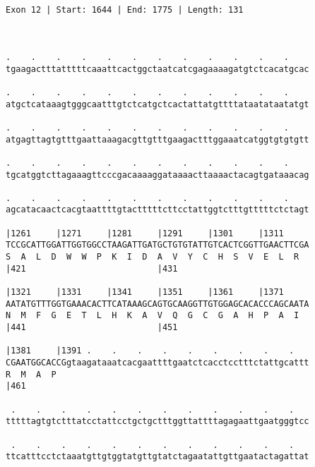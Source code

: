 \documentclass{article}
\begin{document}
\begin{Verbatim}
               
 
Exon 12 | Start: 1644 | End: 1775 | Length: 131



.    .    .    .    .    .    .    .    .    .    .    .    
tgaagactttatttttcaaattcactggctaatcatcgagaaaagatgtctcacatgcac
                                                            
.    .    .    .    .    .    .    .    .    .    .    .    
atgctcataaagtgggcaatttgtctcatgctcactattatgttttataatataatatgt
                                                            
.    .    .    .    .    .    .    .    .    .    .    .    
atgagttagtgtttgaattaaagacgttgtttgaagactttggaaatcatggtgtgtgtt
                                                            
.    .    .    .    .    .    .    .    .    .    .    .    
tgcatggtcttagaaagttcccgacaaaaggataaaacttaaaactacagtgataaacag
                                                            
.    .    .    .    .    .    .    .    .    .    .    .    
agcatacaactcacgtaattttgtactttttcttcctattggtctttgtttttctctagt
                                                            
|1261     |1271     |1281     |1291     |1301     |1311     
TCCGCATTGGATTGGTGGCCTAAGATTGATGCTGTGTATTGTCACTCGGTTGAACTTCGA
S  A  L  D  W  W  P  K  I  D  A  V  Y  C  H  S  V  E  L  R  
|421                          |431                          
  
|1321     |1331     |1341     |1351     |1361     |1371     
AATATGTTTGGTGAAACACTTCATAAAGCAGTGCAAGGTTGTGGAGCACACCCAGCAATA
N  M  F  G  E  T  L  H  K  A  V  Q  G  C  G  A  H  P  A  I  
|441                          |451                          
  
|1381     |1391 .    .    .    .    .    .    .    .    .   
CGAATGGCACCGgtaagataaatcacgaattttgaatctcacctcctttctattgcattt
R  M  A  P                                                  
|461                                                        
  
 .    .    .    .    .    .    .    .    .    .    .    .   
tttttagtgtctttatcctattcctgctgctttggttattttagagaattgaatgggtcc
                                                            
 .    .    .    .    .    .    .    .    .    .    .    .   
ttcatttcctctaaatgttgtggtatgttgtatctagaatattgttgaatactagattat
                                                            

\end{Verbatim}
\end{document}
